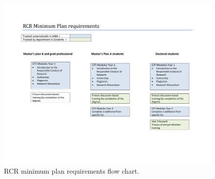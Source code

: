 \begin{center}
\begin{figure}[h]
  \includegraphics[width=\linewidth]{RCR_minimum_plan_requirements_flow_chart.pdf}
  \caption{RCR minimum plan requirements flow chart.}
  \label{fig:rcr_flowchart}
\end{figure}
\end{center}